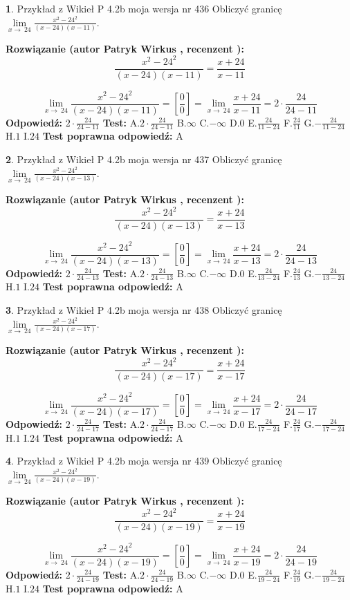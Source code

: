 \documentclass[12pt, a4paper]{article}
\theoremstyle{definition} %
\newtheorem{zad}{}
\newcommand{\zadStart}[1]{\begin{zad}#1\newline}
\newcommand{\zadStop}{\end{zad}}
\newcommand{\rozwStart}[2]{\noindent \textbf{Rozwiązanie (autor #1 , recenzent #2): }\newline}
\newcommand{\rozwStop}{\newline}
\newcommand{\odpStart}{\noindent \textbf{Odpowiedź:}\newline}
\newcommand{\odpStop}{\newline}
\newcommand{\testStart}{\noindent \textbf{Test:}\newline}
\newcommand{\testStop}{\newline}
\newcommand{\kluczStart}{\noindent \textbf{Test poprawna odpowiedź:}\newline}
\newcommand{\kluczStop}{\newline}
\begin{document}
\zadStart{Przykład z Wikieł P 4.2b moja wersja nr 436}
Obliczyć granicę $\lim\limits_{x\to\ 24}\frac{x^{2}-24^{2}}{(x-24)(x-11)}$.
\zadStop
\rozwStart{Patryk Wirkus}{}
$$\frac{x^{2}-24^{2}}{(x-24)(x-11)}=\frac{x+24}{x-11}$$

$$\lim\limits_{x\to\ 24}\frac{x^{2}-24^{2}}{(x-24)(x-11)}=[\frac{0}{0}]=\lim\limits_{x\to\ 24}\frac{x+24}{x-11}=2 \cdot \frac{24}{24-11}$$
\rozwStop
\odpStart
$2 \cdot \frac{24}{24-11}$
\odpStop
\testStart
A.$2 \cdot \frac{24}{24-11}$
B.$\infty$
C.$-\infty$
D.$0$
E.$\frac{24}{11-24}$
F.$\frac{24}{11}$
G.$-\frac{24}{11-24}$
H.$1$
I.$24$
\testStop
\kluczStart
A
\kluczStop



\zadStart{Przykład z Wikieł P 4.2b moja wersja nr 437}
Obliczyć granicę $\lim\limits_{x\to\ 24}\frac{x^{2}-24^{2}}{(x-24)(x-13)}$.
\zadStop
\rozwStart{Patryk Wirkus}{}
$$\frac{x^{2}-24^{2}}{(x-24)(x-13)}=\frac{x+24}{x-13}$$

$$\lim\limits_{x\to\ 24}\frac{x^{2}-24^{2}}{(x-24)(x-13)}=[\frac{0}{0}]=\lim\limits_{x\to\ 24}\frac{x+24}{x-13}=2 \cdot \frac{24}{24-13}$$
\rozwStop
\odpStart
$2 \cdot \frac{24}{24-13}$
\odpStop
\testStart
A.$2 \cdot \frac{24}{24-13}$
B.$\infty$
C.$-\infty$
D.$0$
E.$\frac{24}{13-24}$
F.$\frac{24}{13}$
G.$-\frac{24}{13-24}$
H.$1$
I.$24$
\testStop
\kluczStart
A
\kluczStop



\zadStart{Przykład z Wikieł P 4.2b moja wersja nr 438}
Obliczyć granicę $\lim\limits_{x\to\ 24}\frac{x^{2}-24^{2}}{(x-24)(x-17)}$.
\zadStop
\rozwStart{Patryk Wirkus}{}
$$\frac{x^{2}-24^{2}}{(x-24)(x-17)}=\frac{x+24}{x-17}$$

$$\lim\limits_{x\to\ 24}\frac{x^{2}-24^{2}}{(x-24)(x-17)}=[\frac{0}{0}]=\lim\limits_{x\to\ 24}\frac{x+24}{x-17}=2 \cdot \frac{24}{24-17}$$
\rozwStop
\odpStart
$2 \cdot \frac{24}{24-17}$
\odpStop
\testStart
A.$2 \cdot \frac{24}{24-17}$
B.$\infty$
C.$-\infty$
D.$0$
E.$\frac{24}{17-24}$
F.$\frac{24}{17}$
G.$-\frac{24}{17-24}$
H.$1$
I.$24$
\testStop
\kluczStart
A
\kluczStop



\zadStart{Przykład z Wikieł P 4.2b moja wersja nr 439}
Obliczyć granicę $\lim\limits_{x\to\ 24}\frac{x^{2}-24^{2}}{(x-24)(x-19)}$.
\zadStop
\rozwStart{Patryk Wirkus}{}
$$\frac{x^{2}-24^{2}}{(x-24)(x-19)}=\frac{x+24}{x-19}$$

$$\lim\limits_{x\to\ 24}\frac{x^{2}-24^{2}}{(x-24)(x-19)}=[\frac{0}{0}]=\lim\limits_{x\to\ 24}\frac{x+24}{x-19}=2 \cdot \frac{24}{24-19}$$
\rozwStop
\odpStart
$2 \cdot \frac{24}{24-19}$
\odpStop
\testStart
A.$2 \cdot \frac{24}{24-19}$
B.$\infty$
C.$-\infty$
D.$0$
E.$\frac{24}{19-24}$
F.$\frac{24}{19}$
G.$-\frac{24}{19-24}$
H.$1$
I.$24$
\testStop
\kluczStart
A
\kluczStop
\end{document}
